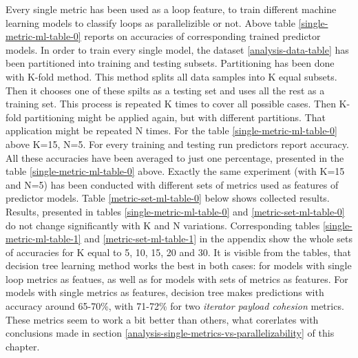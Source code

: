 \null\qquad Every single metric has been used as a loop feature, to train different machine learning models to classify loops as parallelizible or not. Above table \ref{single-metric-ml-table-0} reports on accuracies of corresponding trained predictor models. In order to train every single model, the dataset \ref{analysis-data-table} has been partitioned into training and testing subsets. Partitioning has been done with K-fold method. This method splits all data samples into K equal subsets. Then it chooses one of these spilts as a testing set and uses all the rest as a training set. This process is repeated K times to cover all possible cases. Then K-fold partitioning might be applied again, but with different partitions. That application might be repeated N times. For the table \ref{single-metric-ml-table-0} above K=15, N=5. For every training and testing run predictors report accuracy. All these accuracies have been averaged to just one percentage, presented in the table \ref{single-metric-ml-table-0} above.\newline
\null\qquad Exactly the same experiment (with K=15 and N=5) has been conducted with different sets of metrics used as features of predictor models. Table \ref{metric-set-ml-table-0} below shows collected results.
\null\qquad Results, presented in tables \ref{single-metric-ml-table-0} and \ref{metric-set-ml-table-0} do not change significantly with K and N variations. Corresponding tables \ref{single-metric-ml-table-1} and \ref{metric-set-ml-table-1} in the appendix show the whole sets of accuracies for K equal to 5, 10, 15, 20 and 30.\newline
\null\qquad It is visible from the tables, that decision tree learning method works the best in both cases: for models with single loop metrics as featues, as well as for models with sets of metrics as features. For models with single metrics as features, decision tree makes predictions with accuracy around 65-70\%, with 71-72\% for two \textit{iterator payload cohesion} metrics. These metrics seem to work a bit better than others, what corerlates with conclusions made in section \ref{analysis-single-metrics-vs-parallelizability} of this chapter.\newline
